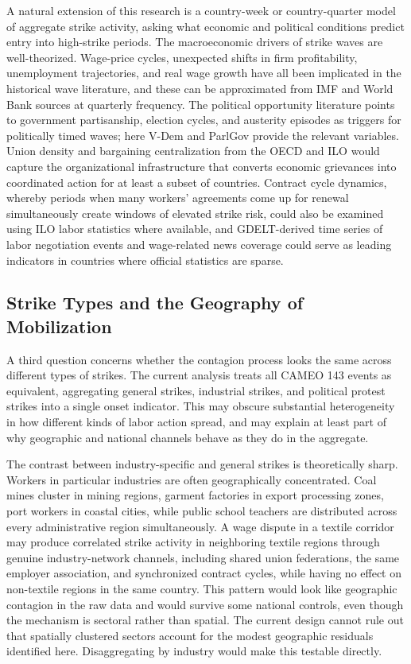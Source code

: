 \documentclass[
  11pt,
]{article}
\begin{document}
A natural extension of this research is a country-week or
country-quarter model of aggregate strike activity, asking what economic
and political conditions predict entry into high-strike periods. The
macroeconomic drivers of strike waves are well-theorized. Wage-price
cycles, unexpected shifts in firm profitability, unemployment
trajectories, and real wage growth have all been implicated in the
historical wave literature, and these can be approximated from IMF and
World Bank sources at quarterly frequency. The political opportunity
literature points to government partisanship, election cycles, and
austerity episodes as triggers for politically timed waves; here V-Dem
and ParlGov provide the relevant variables. Union density and bargaining
centralization from the OECD and ILO would capture the organizational
infrastructure that converts economic grievances into coordinated action
for at least a subset of countries. Contract cycle dynamics, whereby
periods when many workers' agreements come up for renewal simultaneously
create windows of elevated strike risk, could also be examined using ILO
labor statistics where available, and GDELT-derived time series of labor
negotiation events and wage-related news coverage could serve as leading
indicators in countries where official statistics are sparse.

\subsection{Strike Types and the Geography of
Mobilization}\label{strike-types-and-the-geography-of-mobilization}

A third question concerns whether the contagion process looks the same
across different types of strikes. The current analysis treats all CAMEO
143 events as equivalent, aggregating general strikes, industrial
strikes, and political protest strikes into a single onset indicator.
This may obscure substantial heterogeneity in how different kinds of
labor action spread, and may explain at least part of why geographic and
national channels behave as they do in the aggregate.

The contrast between industry-specific and general strikes is
theoretically sharp. Workers in particular industries are often
geographically concentrated. Coal mines cluster in mining regions,
garment factories in export processing zones, port workers in coastal
cities, while public school teachers are distributed across every
administrative region simultaneously. A wage dispute in a textile
corridor may produce correlated strike activity in neighboring textile
regions through genuine industry-network channels, including shared
union federations, the same employer association, and synchronized
contract cycles, while having no effect on non-textile regions in the
same country. This pattern would look like geographic contagion in the
raw data and would survive some national controls, even though the
mechanism is sectoral rather than spatial. The current design cannot
rule out that spatially clustered sectors account for the modest
geographic residuals identified here. Disaggregating by industry would
make this testable directly.
\end{document}
